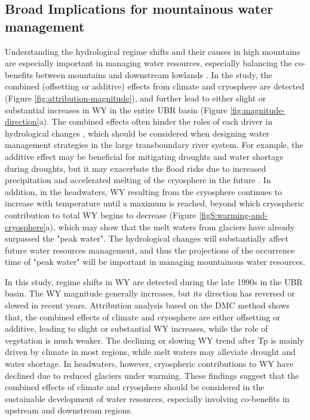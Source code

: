 \documentclass[hess, manuscript]{copernicus}
\begin{document}
\subsection{Broad Implications for mountainous water management}
Understanding the hydrological regime shifts and their causes in high mountains are especially important in managing water resources, especially balancing the co-benefits between mountains and downstream lowlands \citep{viviroli2011climate}. In the study, the combined (offsetting or additive) effects from climate and cryosphere are detected (Figure \ref{fig:attribution-magnitude}), and further lead to either slight or substantial increases in WY in the entire UBR basin (Figure \ref{fig:magnitude-direction}a). The combined effects often hinder the roles of each driver in hydrological changes \citep{wei2018,zhang2021deforestation}, which should be considered when designing water management strategies in the large transboundary river system. For example, the additive effect may be beneficial for mitigating droughts and water shortage during droughts, but it may exacerbate the flood risks due to increased precipitation and accelerated melting of the cryosphere in the future \citep{Immerzeel2013}. In addition, in the headwaters, WY resulting from the cryosphere continues to increase with temperature until a maximum is reached, beyond which cryospheric contribution to total WY begins to decrease (Figure \ref{figS:warming-and-cryosphere}a), which may show that the melt waters from glaciers have already surpassed the "peak water". The hydrological changes will substantially affect future water resources management, and thus the projections of the occurrence time of "peak water" will be important in managing mountainous water resources.

\conclusions 
In this study, regime shifts in WY are detected during the late 1990s in the UBR basin. The WY magnitude generally increases, but its direction has reversed or slowed in recent years. Attribution analysis based on the DMC method shows that, the combined effects of climate and cryosphere are either offsetting or additive, leading to slight or substantial WY increases, while the role of vegetation is much weaker. The declining or slowing WY trend after Tp is mainly driven by climate in most regions, while melt waters may alleviate drought and water shortage. In headwaters, however, cryospheric contributions to WY have declined due to reduced glaciers under warming. These findings suggest that the combined effects of climate and cryosphere should be considered in the sustainable development of water resources, especially involving co-benefits in upstream and downstream regions.
\end{document}
